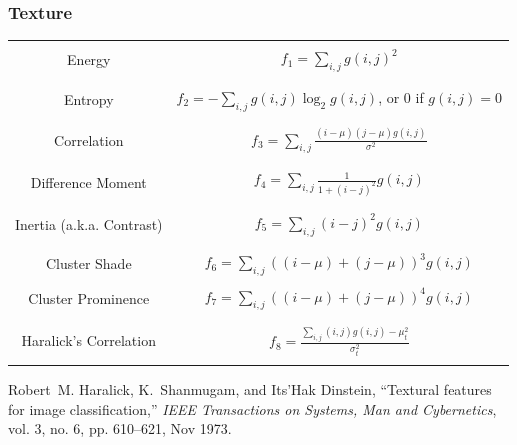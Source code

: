 \documentclass[compress]{beamer}
\begin{document}
\begin{frame}
\frametitle{Texture}
\tiny \centering
\begin{tabular}{cc}
& \\
Energy & $ f_1 = \sum_{i,j}g(i, j)^2 $ \\
& \\
& \\
Entropy & $ f_2 = -\sum_{i,j}g(i, j) \log_2 g(i, j)$, or 0 if $g(i, j) = 0$ \\
& \\
& \\
Correlation & $ f_3 = \sum_{i,j}\frac{(i - \mu)(j - \mu)g(i, j)}{\sigma^2} $ \\
& \\
& \\
Difference Moment &  $f_4 = \sum_{i,j}\frac{1}{1 + (i - j)^2}g(i, j) $ \\
& \\
& \\
Inertia (a.k.a. Contrast) & $ f_5 = \sum_{i,j}(i - j)^2g(i, j) $ \\
& \\
& \\
Cluster Shade & $ f_6 = \sum_{i,j}((i - \mu) + (j - \mu))^3 g(i, j) $ \\
& \\
Cluster Prominence & $ f_7 = \sum_{i,j}((i - \mu) + (j - \mu))^4 g(i, j) $ \\
& \\
& \\
Haralick's Correlation & $ f_8 = \frac{\sum_{i,j}(i, j) g(i, j) -\mu_t^2}{\sigma_t^2} $ \\
& \\
\end{tabular}
\begin{thebibliography}{noidea}
\tiny
{}
Robert~M. Haralick, K.~Shanmugam, and Its'Hak Dinstein,
 ``Textural features for image classification,''
 {\em IEEE Transactions on Systems, Man and Cybernetics}, vol. 3, no.
  6, pp. 610--621, Nov 1973.
\end{thebibliography}
\end{frame}
\end{document}
